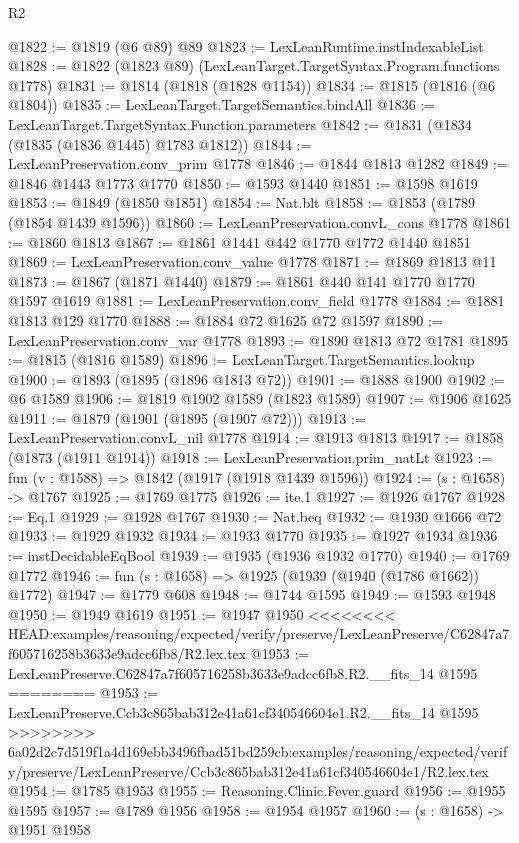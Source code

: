 \begin{lexlean}{R2}
\begin{coremodule}
{{{{{{{{{{{{{{{{{{{{{{{{{{{{{{{{{{{{{{{{{{{{{{{{{{{{{{{{{{{{{{{{{{{{{{{{{{{{{{{{{{{{{{{{{{{{@1822 := @1819 (@6 @89) @89
@1823 := LexLeanRuntime.instIndexableList
@1828 := @1822 (@1823 @89) (LexLeanTarget.TargetSyntax.Program.functions @1778)
@1831 := @1814 (@1818 (@1828 @1154))
@1834 := @1815 (@1816 (@6 @1804))
@1835 := LexLeanTarget.TargetSemantics.bindAll
@1836 := LexLeanTarget.TargetSyntax.Function.parameters
@1842 := @1831 (@1834 (@1835 (@1836 @1445) @1783 @1812))
@1844 := LexLeanPreservation.conv_prim @1778
@1846 := @1844 @1813 @1282
@1849 := @1846 @1443 @1773 @1770
@1850 := @1593 @1440
@1851 := @1598 @1619
@1853 := @1849 (@1850 @1851)
@1854 := Nat.blt
@1858 := @1853 (@1789 (@1854 @1439 @1596))
@1860 := LexLeanPreservation.convL_cons @1778
@1861 := @1860 @1813
@1867 := @1861 @1441 @442 @1770 @1772 @1440 @1851
@1869 := LexLeanPreservation.conv_value @1778
@1871 := @1869 @1813 @11
@1873 := @1867 (@1871 @1440)
@1879 := @1861 @440 @141 @1770 @1770 @1597 @1619
@1881 := LexLeanPreservation.conv_field @1778
@1884 := @1881 @1813 @129 @1770
@1888 := @1884 @72 @1625 @72 @1597
@1890 := LexLeanPreservation.conv_var @1778
@1893 := @1890 @1813 @72 @1781
@1895 := @1815 (@1816 @1589)
@1896 := LexLeanTarget.TargetSemantics.lookup
@1900 := @1893 (@1895 (@1896 @1813 @72))
@1901 := @1888 @1900
@1902 := @6 @1589
@1906 := @1819 @1902 @1589 (@1823 @1589)
@1907 := @1906 @1625
@1911 := @1879 (@1901 (@1895 (@1907 @72)))
@1913 := LexLeanPreservation.convL_nil @1778
@1914 := @1913 @1813
@1917 := @1858 (@1873 (@1911 @1914))
@1918 := LexLeanPreservation.prim_natLt
@1923 := fun (v : @1588) => @1842 (@1917 (@1918 @1439 @1596))
@1924 := (s : @1658) -> @1767
@1925 := @1769 @1775
@1926 := ite.{1}
@1927 := @1926 @1767
@1928 := Eq.{1}
@1929 := @1928 @1767
@1930 := Nat.beq
@1932 := @1930 @1666 @72
@1933 := @1929 @1932
@1934 := @1933 @1770
@1935 := @1927 @1934
@1936 := instDecidableEqBool
@1939 := @1935 (@1936 @1932 @1770)
@1940 := @1769 @1772
@1946 := fun (s : @1658) => @1925 (@1939 (@1940 (@1786 @1662)) @1772)
@1947 := @1779 @608
@1948 := @1744 @1595
@1949 := @1593 @1948
@1950 := @1949 @1619
@1951 := @1947 @1950
<<<<<<<< HEAD:examples/reasoning/expected/verify/preserve/LexLeanPreserve/C62847a7f605716258b3633e9adcc6fb8/R2.lex.tex
@1953 := LexLeanPreserve.C62847a7f605716258b3633e9adcc6fb8.R2.__fits_14 @1595
========
@1953 := LexLeanPreserve.Ccb3c865bab312e41a61cf340546604e1.R2.__fits_14 @1595
>>>>>>>> 6a02d2c7d519f1a4d169ebb3496fbad51bd259cb:examples/reasoning/expected/verify/preserve/LexLeanPreserve/Ccb3c865bab312e41a61cf340546604e1/R2.lex.tex
@1954 := @1785 @1953
@1955 := Reasoning.Clinic.Fever.guard
@1956 := @1955 @1595
@1957 := @1789 @1956
@1958 := @1954 @1957
@1960 := (s : @1658) -> @1951 @1958
}}}}}}}}}}}}}}}}}}}}}}}}}}}}}}}}}}}}}}}}}}}}}}}}}}}}}}}}}}}}}}}}}}}}}}}}}}}}}}}}}}}}}}}}}}}}
\end{coremodule}
\end{lexlean}
